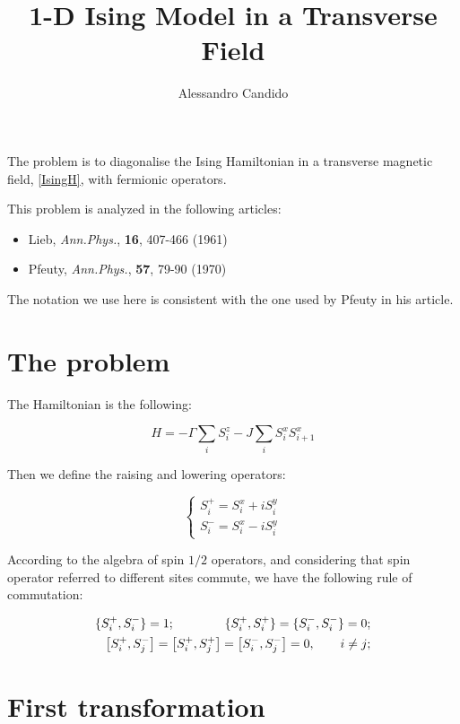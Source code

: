 \documentclass[a4paper,10pt]{article}
\title{1-D Ising Model in a Transverse Field}
\author{Alessandro Candido}
\begin{document}
\maketitle

The problem is to diagonalise the Ising Hamiltonian in a transverse magnetic field, \cref{IsingH}, with fermionic operators.

This problem is analyzed in the following articles:
\begin{itemize}
	\item Lieb, \textit{Ann.Phys.}, \textbf{16}, 407-466 (1961)
	\item Pfeuty, \textit{Ann.Phys.}, \textbf{57}, 79-90 (1970)
\end{itemize}

\noindent The notation we use here is consistent with the one used by Pfeuty in his article.

\section*{The problem}

The Hamiltonian is the following:

\begin{equation}
H = - \Gamma \sum_i S_i^z - J \sum_i S_i^x S_{i+1}^x
\label{IsingH}
\end{equation}

Then we define the raising and lowering operators:

\begin{equation}
\begin{cases}
S_i^+ = S_i^x + i S_i^y\\
S_i^- = S_i^x - i S_i^y
\end{cases}
\end{equation}

According to the algebra of spin $1/2$ operators, and considering that spin operator referred to different sites commute, we have the following rule of commutation:

\begin{align*}
\{S_i^+, S_i^-\} = 1; \qquad \qquad \{S_i^+, S_i^+\} = \{S_i^-, S_i^-\} = 0; \\
\comm{S_i^+}{S_j^-}= \comm{S_i^+}{S_j^+} = \comm{S_i^-}{S_j^-} = 0, \qquad	i\neq j;
\end{align*}

\section{First transformation}
\end{document}
